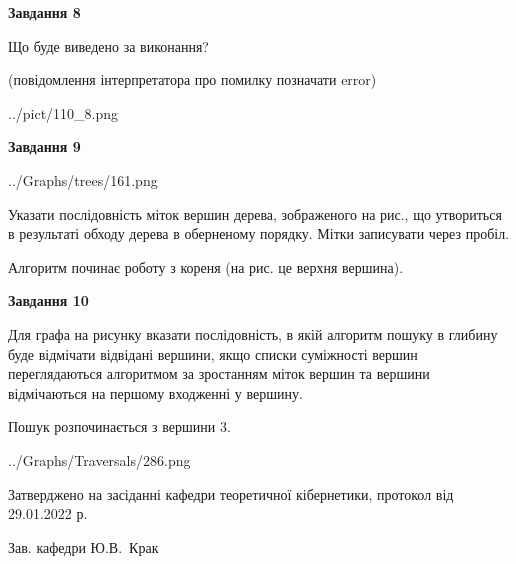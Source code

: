 \documentclass[12pt, ukrainian]{article}
\begin{document}
{\begin {large}
{\begin {center}\textbf{Завдання 8}\end {center}}\par
Що буде виведено за виконання?\par
 (повідомлення інтерпретатора про помилку позначати error)\par
\begin{center}
	{../pict/110_8.png}
\end{center}
\newpage

{\begin {center}\textbf{Завдання 9}\end {center}}\par

\begin{center}
	{../Graphs/trees/161.png}
\end{center}
Указати послідовність міток вершин дерева, зображеного на рис., що утвориться в результаті обходу дерева в оберненому порядку. Мітки записувати через пробіл.\par Алгоритм починає роботу з кореня (на рис. це верхня вершина).\par
\newpage

{\begin {center}\textbf{Завдання 10}\end {center}}\par
Для графа на рисунку вказати послідовність, в якій алгоритм пошуку в глибину буде відмічати відвідані вершини, якщо списки суміжності вершин переглядаються алгоритмом за зростанням міток вершин та вершини відмічаються на першому вход\-женні у вершину.\par
Пошук розпочинається з вершини 3.\par

\begin{center}
	{../Graphs/Traversals/286.png}
\end{center}\par
\newpage


\end {large}
}
{\smallskip \begin {small} Затверджено на засіданні кафедри теоретичної кібернетики, протокол  від   29.01.2022 р.\par\smallskip\smallskip
{\parbox {6.5 cm}{Зав. кафедри \dotfill Ю.В.~Крак}} \end{small}}
\end{document}
